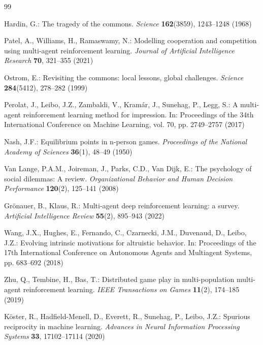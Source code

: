 \documentclass[runningheads]{llncs}
\begin{document}
\begin{thebibliography}{99}

Hardin, G.: The tragedy of the commons. \textit{Science} \textbf{162}(3859), 1243--1248 (1968)

Patel, A., Williams, H., Ramaswamy, N.: Modelling cooperation and competition using multi-agent reinforcement learning. \textit{Journal of Artificial Intelligence Research} \textbf{70}, 321--355 (2021)

Ostrom, E.: Revisiting the commons: local lessons, global challenges. \textit{Science} \textbf{284}(5412), 278--282 (1999)

Perolat, J., Leibo, J.Z., Zambaldi, V., Kramár, J., Sunehag, P., Legg, S.: A multi-agent reinforcement learning method for impression. In: Proceedings of the 34th International Conference on Machine Learning, vol. 70, pp. 2749--2757 (2017)

Nash, J.F.: Equilibrium points in n-person games. \textit{Proceedings of the National Academy of Sciences} \textbf{36}(1), 48--49 (1950)

Van Lange, P.A.M., Joireman, J., Parks, C.D., Van Dijk, E.: The psychology of social dilemmas: A review. \textit{Organizational Behavior and Human Decision Performance} \textbf{120}(2), 125--141 (2008)

Grönauer, B., Klaus, R.: Multi-agent deep reinforcement learning: a survey. \textit{Artificial Intelligence Review} \textbf{55}(2), 895--943 (2022)

Wang, J.X., Hughes, E., Fernando, C., Czarnecki, J.M., Duvenaud, D., Leibo, J.Z.: Evolving intrinsic motivations for altruistic behavior. In: Proceedings of the 17th International Conference on Autonomous Agents and Multiagent Systems, pp. 683--692 (2018)

Zhu, Q., Tembine, H., Bas, T.: Distributed game play in multi-population multi-agent reinforcement learning. \textit{IEEE Transactions on Games} \textbf{11}(2), 174--185 (2019)

Köster, R., Hadfield-Menell, D., Everett, R., Sunehag, P., Leibo, J.Z.: Spurious reciprocity in machine learning. \textit{Advances in Neural Information Processing Systems} \textbf{33}, 17102--17114 (2020)


\end{thebibliography}
\end{document}
